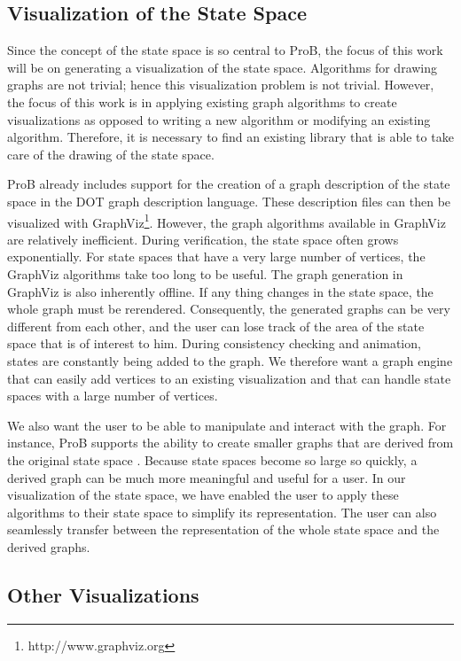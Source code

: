 \subsection{Visualization of the State Space}

Since the concept of the state space is so central to ProB, the focus of this work will be on generating a visualization of the state space. Algorithms for drawing graphs are not trivial; hence this visualization problem is not trivial. However, the focus of this work is in applying existing graph algorithms to create visualizations as opposed to writing a new algorithm or modifying an existing algorithm. Therefore, it is necessary to find an existing library that is able to take care of the drawing of the state space.

ProB already includes support for the creation of a graph description of the state space in the DOT graph description language. These description files can then be visualized with GraphViz\footnote{http://www.graphviz.org}. However, the graph algorithms available in GraphViz are relatively inefficient. During verification, the state space often grows exponentially. For state spaces that have a very large number of vertices, the GraphViz algorithms take too long to be useful. The graph generation in GraphViz is also inherently offline. If any thing changes in the state space, the whole graph must be rerendered. Consequently, the generated graphs can be very different from each other, and the user can lose track of the area of the state space that is of interest to him. During consistency checking and animation, states are constantly being added to the graph. We therefore want a graph engine that can easily add vertices to an existing visualization and that can handle state spaces with a large number of vertices.

We also want the user to be able to manipulate and interact with the graph. For instance, ProB supports the ability to create smaller graphs that are derived from the original state space \cite{LeTu05_8}. Because state spaces become so large so quickly, a derived graph can be much more meaningful and useful for a user. In our visualization of the state space, we have enabled the user to apply these algorithms to their state space to simplify its representation. The user can also seamlessly transfer between the representation of the whole state space and the derived graphs.

\subsection{Other Visualizations}

